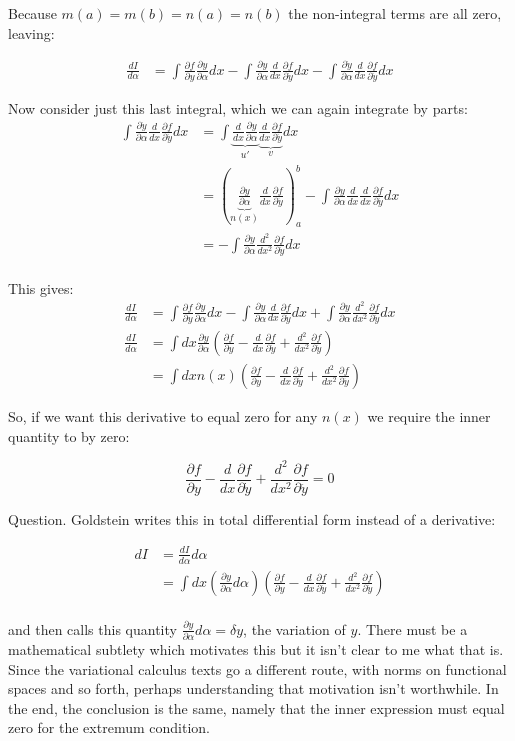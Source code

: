 \documentclass{article}
\newcommand{\ydot}[0]{\dot{y}}
\newcommand{\yddot}[0]{\ddot{y}}
\newcommand{\PD}[2]{\frac{\partial {#2}}{\partial {#1}}}
\begin{document}
Because $m(a) = m(b) = n(a) = n(b)$ the non-integral terms are all zero, leaving:

\begin{align*}
\frac{dI}{d\alpha} &= 
  \int \PD{y}{f} \PD{\alpha}{y} d x
- \int \PD{\alpha}{y} \frac{d}{ d x} \PD{\ydot}{f} d x
- \int \PD{\alpha}{\ydot} \frac{d}{ d x} \PD{\yddot}{f} d x
\end{align*}

Now consider just this last integral, which we can again integrate by parts:
\begin{align*}
\int \PD{\alpha}{\ydot} \frac{d}{ d x} \PD{\yddot}{f} d x
&= \int \underbrace{\frac{d}{dx} \PD{\alpha}{y}}_{u'} \underbrace{\frac{d}{ d x} \PD{\yddot}{f}}_{v} d x \\
&= 
\left( \underbrace{\PD{\alpha}{y}}_{n(x)} {\frac{d}{ d x} \PD{\yddot}{f}} \right)_a^b
-\int \PD{\alpha}{y} \frac{d}{dx} {\frac{d}{ d x} \PD{\yddot}{f}} d x \\
&= 
-\int \PD{\alpha}{y} \frac{d^2}{dx^2} \PD{\yddot}{f} d x \\
\end{align*}

This gives:
\begin{align*}
\frac{dI}{d\alpha} &= 
  \int \PD{y}{f} \PD{\alpha}{y} d x
- \int \PD{\alpha}{y} \frac{d}{ d x} \PD{\ydot}{f} d x
+ \int \PD{\alpha}{y} \frac{d^2}{dx^2} \PD{\yddot}{f} d x \\
\frac{dI}{d\alpha} 
&= \int d x \PD{\alpha}{y} \left( \PD{y}{f} - \frac{d}{ d x} \PD{\ydot}{f} + \frac{d^2}{dx^2} \PD{\yddot}{f} \right) \\
&= \int d x n(x) \left( \PD{y}{f} - \frac{d}{ d x} \PD{\ydot}{f} + \frac{d^2}{dx^2} \PD{\yddot}{f} \right)
\end{align*}

So, if we want this derivative to equal zero for any $n(x)$ we require the inner quantity to by zero:

\begin{equation}
\PD{y}{f} - \frac{d}{ d x} \PD{\ydot}{f} + \frac{d^2}{dx^2} \PD{\yddot}{f} = 0
\end{equation}

Question.  Goldstein writes this in total differential form instead of a derivative:

\begin{align*}
dI &= \frac{dI}{d\alpha} d\alpha \\
&= \int d x \left(\PD{\alpha}{y} d \alpha\right) \left( \PD{y}{f} - \frac{d}{ d x} \PD{\ydot}{f} + \frac{d^2}{dx^2} \PD{\yddot}{f} \right) \\
\end{align*}

and then calls this quantity $\PD{\alpha}{y} d \alpha = \delta y$, the variation of $y$.  There must be a mathematical subtlety which motivates this
but it isn't clear to me what that is.  Since the variational calculus texts go a different route, with norms on functional spaces and so forth, perhaps
understanding that motivation isn't worthwhile.  In the end, the conclusion is the same, namely that the inner expression must equal zero for the extremum
condition.



\end{document}
